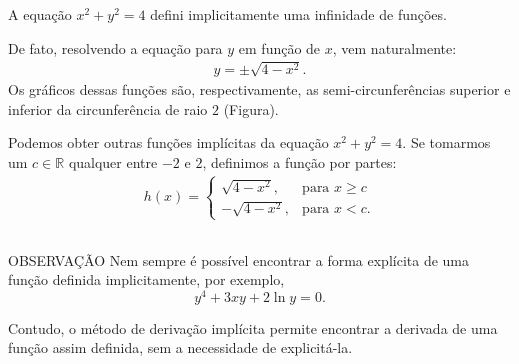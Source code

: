 \begin{frame}
    \vspace{-15pt}
    \begin{columns}\justifying
        \begin{example-highlight}
            A equação $x^2 + y^2 = 4$ defini implicitamente uma infinidade de funções.
            
            De fato, resolvendo a equação para $y$ em função de $x$, vem naturalmente:
            \begin{align*}
                y = \pm\sqrt{4-x^2}.
            \end{align*}
            Os gráficos dessas funções são, respectivamente, as semi-circunferências superior e inferior da circunferência de raio $2$ (Figura).
            
            Podemos obter outras funções implícitas da equação $x^2+y^2=4$. Se tomarmos um \mbox{$c\in\mathbb{R}$} qualquer entre $-2$ e $2$, definimos a função por partes:
            \begin{align*}
                h(x)=\begin{cases}
                    \sqrt{4-x^2}, & \text{para }  x\geq c\\
                    -\sqrt{4-x^2}, & \text{para } x < c.
                \end{cases}
            \end{align*}
        \end{example-highlight}      
      
    \end{columns}
\end{frame}

\begin{frame}
      \begin{alertblock}{OBSERVAÇÃO}\justifying
      Nem sempre é possível encontrar a forma explícita de uma função definida implicitamente, por exemplo, $$y^4+3xy+2\ln y = 0.$$
      
      Contudo, o método de derivação implícita permite encontrar a derivada de uma função assim definida, sem a necessidade de explicitá-la.
      \end{alertblock}
\end{frame}

